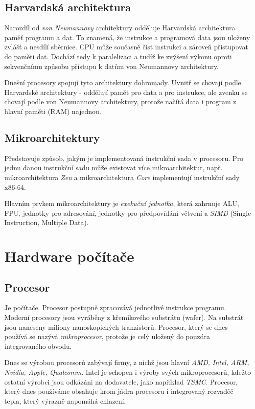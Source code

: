 \documentclass[a4paper]{article}
\begin{document}
    \subsection{Harvardská architektura}
        Narozdíl od \textit{von Neumannovy} architektury odděluje Harvardská architektura paměť programu a dat. To znamená, že instrukce a programová data jsou uloženy zvlášť a nesdílí sběrnice. CPU může současně číst instrukci a zároveň přistupovat do paměti dat. Dochází tedy k paralelizaci a tudíž ke zvýšení výkonu oproti sekvenčnímu způsobu přístupu k datům von Neumannovy architektury.
        \par
        Dnešní procesory spojují tyto architektury dohromady. Uvnitř se chovají podle Harvardské architektury - oddělují paměť pro data a pro instrukce, ale zvenku se chovají podle von Neumannovy architektury, protože načítá data i program z hlavní paměti (RAM) najednou.
    \subsection{Mikroarchitektury}
        Představuje způsob, jakým je implementovaná instrukční sada v procesoru. Pro jednu danou instrukční sadu může existovat více mikroarchitektur, např. mikroarchitektura \textit{Zen} a mikroarchitektura \textit{Core} implementují instrukční sady x86-64.
        \par
        Hlavním prvkem mikroarchitektury je \textit{exekuční jednotka}, která zahrnuje ALU, FPU, jednotky pro adresování, jednotky pro předpovídání větvení a \textit{SIMD} (Single Instruction, Multiple Data).

\newpage


\section{Hardware počítače}
    \subsection{Procesor}
        Je  počítače. Procesor postupně zpracovává jednotlivé instrukce programu. Moderní procesory jsou vyráběny z křemíkového substrátu (wafer). Na substrát jsou naneseny miliony nanoskopických tranzistorů. Procesor, který se dnes používá se nazývá \textit{mikroprocesor}, protože je celý uložený do pouzdra integrovaného obvodu. \par
        Dnes se výrobou procesorů zabývají firmy, z nichž jsou hlavní \textit{AMD, Intel, ARM, Nvidia, Apple, Qualcomm}. Intel je schopen i výroby svých mikroprocesorů, kdežto ostatní výrobci jsou odkázáni na dodavatele, jako například \textit{TSMC}.
        Procesor, který dnes používáme obsahuje krom jádra procesoru i integrovaný rozvaděč tepla, který výrazně napomáhá chlazení.
\end{document}

